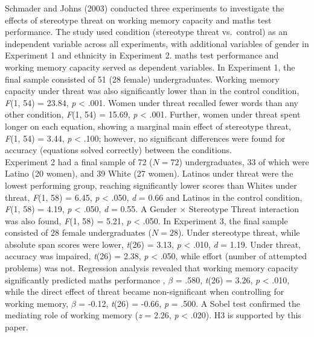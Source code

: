 \documentclass[
  stu, a4paper,floatsintext]{apa7}
\begin{document}
Schmader and Johns (2003) conducted three experiments to investigate the effects of stereotype threat on working memory capacity and maths test performance.
The study used condition (stereotype threat vs.~control) as an independent variable across all experiments, with additional variables of gender in Experiment 1 and ethnicity in Experiment 2.
maths test performance and working memory capacity served as dependent variables.
In Experiment 1, the final sample consisted of 51 (28 female) undergraduates.
Working memory capacity under threat was also significantly lower than in the control condition, \emph{F}(1, 54) = 23.84, \emph{p} \textless{} .001.
Women under threat recalled fewer words than any other condition, \emph{F}(1, 54) = 15.69, \emph{p} \textless{} .001.
Further, women under threat spent longer on each equation, showing a marginal main effect of stereotype threat, \emph{F}(1, 54) = 3.44, \emph{p} \textless{} .100; however, no significant differences were found for accuracy (equations solved correctly) between the conditions.\\
Experiment 2 had a final sample of 72 (\(N = 72\)) undergraduates, 33 of which were Latino (20 women), and 39 White (27 women).
Latinos under threat were the lowest performing group, reaching significantly lower scores than Whites under threat, \emph{F}(1, 58) = 6.45, \emph{p} \textless{} .050, \emph{d} = 0.66 and Latinos in the control condition, \emph{F}(1, 58) = 4.19, \emph{p} \textless{} .050, \emph{d} = 0.55.
A Gender \(\times\) Stereotype Threat interaction was also found, \emph{F}(1, 58) = 5.21, \emph{p} \textless{} .050.
In Experiment 3, the final sample consisted of 28 female undergraduates (\(N = 28\)).
Under stereotype threat, while absolute span scores were lower, \emph{t}(26) = 3.13, \emph{p} \textless{} .010, \emph{d} = 1.19.
Under threat, accuracy was impaired, \emph{t}(26) = 2.38, \emph{p} \textless{} .050, while effort (number of attempted problems) was not.
Regression analysis revealed that working memory capacity significantly predicted maths performance , \(\beta\) = .580, \emph{t}(26) = 3.26, \emph{p} \textless{} .010, while the direct effect of threat became non-significant when controlling for working memory, \(\beta\) = -0.12, \emph{t}(26) = -0.66, \emph{p} = .500.
A Sobel test confirmed the mediating role of working memory (\emph{z} = 2.26, \emph{p} \textless{} .020).
H3 is supported by this paper.
\end{document}
